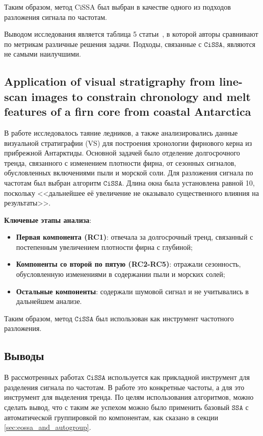 \documentclass[12pt, specialist, subf
]{disser}
\theoremstyle{definition}
\newcommand{\SSA}{\texttt{SSA}}
\newcommand{\CISSA}{\texttt{CiSSA}}
\begin{document}
Таким образом, метод CiSSA был выбран в качестве одного из подходов разложения сигнала по частотам.

Выводом исследования является таблица 5 статьи~\cite{cognitive}, в которой авторы сравнивают по метрикам различные решения задачи. Подходы, связанные с $\CISSA$, являются не самыми наилучшими.



\subsection{Application of visual stratigraphy from line-scan images to constrain chronology and melt features of a firn core from coastal Antarctica}

В работе \cite{Dey_Thamban_Laluraj_Mahalinganathan_Redkar_Kumar_Matsuoka_2023} исследовалось таяние ледников, а также анализировались данные визуальной стратиграфии (VS) для построения хронологии фирнового керна из прибрежной Антарктиды. Основной задачей было отделение долгосрочного тренда, связанного с изменением плотности фирна, от сезонных сигналов, обусловленных включениями пыли и морской соли.
Для разложения сигнала по частотам был выбран алгоритм $\CISSA$. Длина окна была установлена равной 10, поскольку <<дальнейшее её увеличение не оказывало существенного влияния на результаты>>.

\noindent \textbf{Ключевые этапы анализа}:

\begin{itemize}
	\item \textbf{Первая компонента (RC1)}: отвечала за долгосрочный тренд, связанный с постепенным увеличением плотности фирна с глубиной;
	\item \textbf{Компоненты со второй по пятую (RC2-RC5)}: отражали сезонность, обусловленную изменениями в содержании пыли и морских солей;
	\item \textbf{Остальные компоненты}: содержали шумовой сигнал и не учитывались в дальнейшем анализе.
\end{itemize}

Таким образом, метод $\CISSA$ был использован как инструмент частотного разложения.

\subsection{Выводы}

В рассмотренных работах $\CISSA$ используется как прикладной инструмент для разделения сигнала по частотам. В работе \cite{cognitive} это конкретные частоты, а для \cite{Dey_Thamban_Laluraj_Mahalinganathan_Redkar_Kumar_Matsuoka_2023} это инструмент для выделения тренда. По целям использования алгоритмов, можно сделать вывод, что с таким же успехом можно было применить базовый $\SSA$ с автоматической группировкой по компонентам, как сказано в секции \ref{sec:eossa_and_autogroup}.
\end{document}
